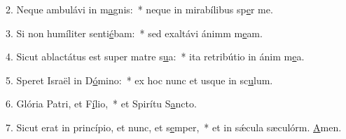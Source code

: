 2. Neque ambulávi in m\uline{a}gnis:~* neque in mirabílibus sp\uline{e}r me.\par 
3. Si non humíliter senti\uline{é}bam:~* sed exaltávi ánimm m\uline{e}am.\par 
4. Sicut ablactátus est super matre s\uline{u}a:~* ita retribútio in ánim m\uline{e}a.\par 
5. Speret Israël in D\uline{ó}mino:~* ex hoc nunc et usque in sc\uline{u}lum.\par 
6. Glória Patri, et F\uline{í}lio,~* et Spirítu S\uline{a}ncto.\par 
7. Sicut erat in princípio, et nunc, et s\uline{e}mper,~* et in sǽcula sæculórm. \uline{A}men.\par 
